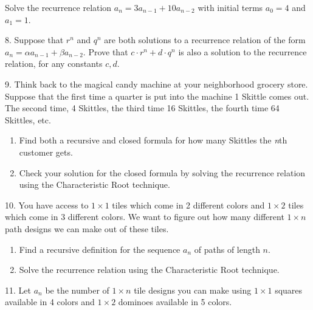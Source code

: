 \documentclass[12pt,]{book}
\theoremstyle{plain}
\theoremstyle{definition}
\theoremstyle{definition}
\theoremstyle{definition}
\numberwithin{equation}{chapter}
\begin{document}
\begin{exerciselist}
Solve the recurrence relation \(a_n = 3a_{n-1} + 10a_{n-2}\) with initial terms \(a_0 = 4\) and \(a_1 = 1\).%
\par\smallskip
\item[8.]\hypertarget{exercise-40}{}\hypertarget{p-352}{}%
Suppose that \(r^n\) and \(q^n\) are both solutions to a recurrence relation of the form \(a_n = \alpha a_{n-1} + \beta a_{n-2}\).  Prove that \(c\cdot r^n + d \cdot q^n\) is also a solution to the recurrence relation, for any constants \(c, d\).%
\par\smallskip
\item[9.]\hypertarget{exercise-41}{}\hypertarget{p-353}{}%
Think back to the magical candy machine at your neighborhood grocery store. Suppose that the first time a quarter is put into the machine 1 Skittle comes out. The second time, 4 Skittles, the third time 16 Skittles, the fourth time 64 Skittles, etc. \leavevmode%
\begin{enumerate}[label=(\alph*)]
\item\hypertarget{li-183}{}\hypertarget{p-354}{}%
Find both a recursive and closed formula for how many Skittles the \emph{n}th customer gets.%
\item\hypertarget{li-184}{}\hypertarget{p-355}{}%
Check your solution for the closed formula by solving the recurrence relation using the Characteristic Root technique.%
\end{enumerate}
%
\par\smallskip
\item[10.]\hypertarget{exercise-42}{}\hypertarget{p-356}{}%
You have access to \(1 \times 1\) tiles which come in 2 different colors and \(1\times 2\) tiles which come in 3 different colors. We want to figure out how many different \(1 \times n\) path designs we can make out of these tiles.%
\leavevmode%
\begin{enumerate}[label=(\alph*)]
\item\hypertarget{li-185}{}\hypertarget{p-357}{}%
Find a recursive definition for the sequence \(a_n\) of paths of length \(n\).%
\item\hypertarget{li-186}{}\hypertarget{p-358}{}%
Solve the recurrence relation using the Characteristic Root technique.%
\end{enumerate}
\par\smallskip
\item[11.]\hypertarget{exercise-43}{}\hypertarget{p-359}{}%
Let \(a_n\) be the number of \(1 \times n\) tile designs you can make using \(1 \times 1\) squares available in 4 colors and \(1 \times 2\) dominoes available in 5 colors.%

\end{exerciselist}
\end{document}
